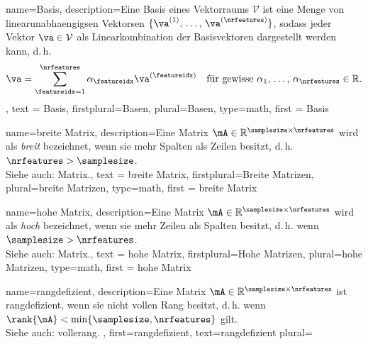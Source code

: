 {
  name={Basis},
  description={Eine Basis\cite{Soergel201x_AlgebraMitBildern} eines \gls{Vektorraums} $\mathcal{V}$ 
  ist eine Menge von \glspl{linearunabhaengig}en \glspl{Vektor}en 
  $\{\va^{(1)}, \,\ldots, \,\va^{(\nrfeatures)}\}$, 
  sodass jeder Vektor $\va \in \mathcal{V}$ als Linearkombination 
  der Basisvektoren dargestellt werden kann, d.\,h.
  $$
    \va = \sum_{\featureidx=1}^{\nrfeatures} \alpha_{\featureidx} \va^{(\featureidx)} 
    \quad \text{für gewisse } \alpha_{1}, \,\ldots, \,\alpha_{\nrfeatures} \in \mathbb{R}.
  $$
  },
  text = {Basis}, 
  firstplural={Basen}, 
  plural={Basen}, 
  type=math,
  first = {Basis}
}


{
  name={breite Matrix},
  description={Eine \gls{Matrix} 
  $\mA \in \mathbb{R}^{\samplesize \times \nrfeatures}$ 
  wird als \emph{breit} bezeichnet, wenn sie mehr Spalten als Zeilen besitzt, 
  d.\,h. $\nrfeatures > \samplesize$.\\ 
  Siehe auch: \gls{Matrix}.},
  text = {breite Matrix}, 
  firstplural={Breite Matrizen}, 
  plural={breite Matrizen}, 
  type=math,
  first = {breite Matrix}
}

{
  name={hohe Matrix},
  description={Eine \gls{Matrix} 
  $\mA \in \mathbb{R}^{\samplesize \times \nrfeatures}$ 
  wird als \emph{hoch} bezeichnet, wenn sie mehr Zeilen als Spalten besitzt, 
  d.\,h. wenn $\samplesize > \nrfeatures$.\\ 
  Siehe auch: \gls{Matrix}.},
  text = {hohe Matrix}, 
  firstplural={Hohe Matrizen}, 
  plural={hohe Matrizen}, 
  type=math,
  first = {hohe Matrix}
}


{
  name={rangdefizient},
  description={Eine \gls{Matrix} $\mA \in \mathbb{R}^{\samplesize \times \nrfeatures}$ 
   ist  rangdefizient\cite{Krause2021}, wenn sie nicht vollen Rang besitzt, 
  d.\,h. wenn $\rank{\mA} < \min\{\samplesize, \nrfeatures\}$ gilt.\\
  Siehe auch: \gls{vollerang}. 
  }, 
  first={rangdefizient}, 
  text={rangdefizient}
  plural= 
}

